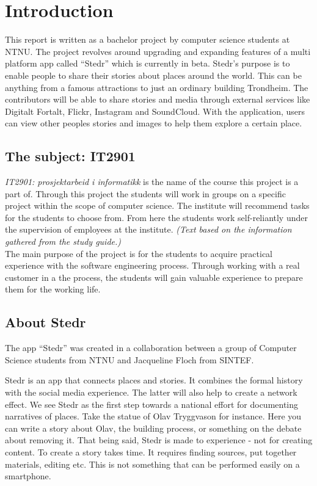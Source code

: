 \section{Introduction}
\thispagestyle{plain}
	\setcounter{page}{1}


This report is written as a bachelor project by computer science students at NTNU. The project revolves around upgrading and expanding features of a multi platform app called “Stedr” which is currently in beta. Stedr's purpose is to enable people to share their stories about places around the world. This can be anything from a famous attractions to just an ordinary building Trondheim. The contributors will be able to share stories and media through external services like Digitalt Fortalt, Flickr, Instagram and SoundCloud. With the application, users can view other peoples stories and images  to help them explore a certain place.

\subsection{The subject: IT2901}
\emph{IT2901: prosjektarbeid i informatikk} is the name of the course this project is a part of. Through this project the students will work in groups on a specific project within the scope of computer science. The institute will recommend tasks for the students to choose from. From here the students work self-reliantly under the supervision of employees at the institute. \textit{(Text based on the information gathered from the study guide.)}\\ The main purpose of the project is for the students to acquire practical experience with the software engineering process. Through working with a real customer in a the process, the students will gain valuable experience to prepare them for the working life.

\subsection{About Stedr}
The app “Stedr” was created in a collaboration between a group of Computer Science students from NTNU and Jacqueline Floch from SINTEF. 

Stedr is an app that connects places and stories. It combines the formal history with the social media experience. The latter will also help to create a network effect. 
We see Stedr as the first step towards a national effort for documenting narratives of places. Take the statue of Olav Tryggvason for instance. Here you can write a story about Olav, the building process, or something on the debate about removing it. That being said, Stedr is made to experience - not for creating content. To create a story takes time. It requires finding sources, put together materials, editing etc. This is not something that can be performed easily on a smartphone.

